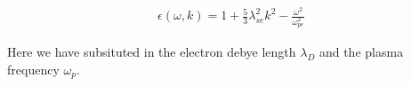 	\begin{align}
	\epsilon(\omega, k) = 1 + \frac{5}{3} \lambda_{se}^2k ^2 -  \frac{\omega^2}{\omega_{pe}^2}
	\end{align}

	Here we have subsituted in the electron debye length \(\lambda_{D}\) and the plasma frequency \(\omega_{p}\).

%
%
%
